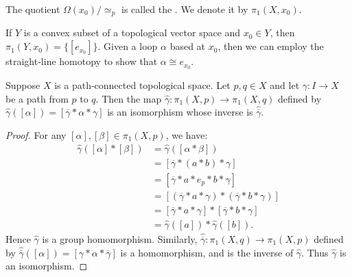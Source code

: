 \begin{definition}
    The quotient $\Omega(x_0)/\simeq_p$ is called the . We denote it by $\pi_1(X,x_0)$.
\end{definition}

\begin{example}
    If $Y$ is a convex subset of a topological vector space and $x_0 \in Y$, then $\pi_1(Y,x_0) = \{[e_{x_0}]\}$. Given a loop $\alpha$ based at $x_0$, then we can employ the straight-line homotopy to show that $\alpha \cong e_{x_0}$.
\end{example}

\begin{theorem}
    Suppose $X$ is a path-connected topological space. Let $p,q \in X$ and let $\gamma:I \rightarrow X$ be a path from $p$ to $q$. Then the map $\widehat{\gamma}:\pi_1(X,p) \rightarrow \pi_1(X,q)$ defined by $\widehat{\gamma}([\alpha]) = [\overline{\gamma}\ast \alpha \ast \gamma]$ is an isomorphism whose inverse is $\widehat{\overline{\gamma}}$.
\end{theorem}
    \begin{proof}
        For any $[\alpha], [\beta] \in \pi_1(X,p)$, we have:
            \begin{equation*}
            \begin{split}
                \widehat{\gamma}([\alpha] \ast [\beta])
                & = \widehat{\gamma}([\alpha \ast \beta]) \\
                & = [\overline{\gamma} \ast (a \ast b) \ast \gamma] \\
                & = [\overline{\gamma} \ast a \ast e_p \ast b \ast \gamma] \\
                & = [(\overline{\gamma} \ast a \ast \gamma )\ast (\overline{\gamma} \ast b \ast \gamma)] \\
                & = [\overline{\gamma} \ast a \ast \gamma] \ast [\overline{\gamma} \ast b \ast \gamma] \\
                & = \widehat{\gamma}([a]) \ast \widehat{\gamma}([b]).
            \end{split}
            \end{equation*}
        Hence $\widehat{\gamma}$ is a group homomorphism. Similarly, $\widehat{\overline{\gamma}}:\pi_1(X,q) \rightarrow \pi_1(X,p)$ defined by $\widehat{\overline{\gamma}}([\alpha]) = [\gamma \ast \alpha \ast \overline{\gamma}]$ is a homomorphism, and is the inverse of $\widehat{\gamma}$. Thus $\widehat{\gamma}$ is an isomorphism.
    \end{proof}

